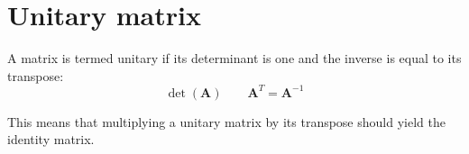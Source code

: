 \section{Unitary matrix}

\begin{definition}
    A matrix is termed unitary if its determinant is one and the inverse is equal to its transpose:
    \[\det (\mathbf{A}) \qquad \mathbf{A}^T=\mathbf{A}^{-1}\]
\end{definition}
\noindent This means that multiplying a unitary matrix by its transpose should yield the identity matrix. 